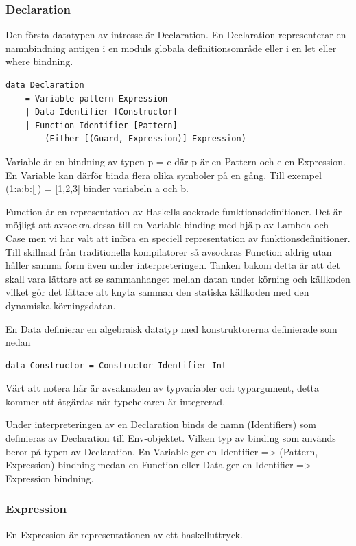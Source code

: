\subsubsection{Declaration}
Den första datatypen av intresse är Declaration. En Declaration representerar en namnbindning antigen i en moduls globala definitionsområde eller i en let eller where bindning.

\begin{lstlisting}
data Declaration 
    = Variable pattern Expression
    | Data Identifier [Constructor]
    | Function Identifier [Pattern] 
        (Either [(Guard, Expression)] Expression)
\end{lstlisting}

Variable är en bindning av typen p = e där p är en Pattern och e en Expression. En Variable kan därför binda flera olika symboler på en gång. Till exempel (1:a:b:[]) = [1,2,3] binder variabeln a och b.

Function är en representation av Haskells sockrade funktionsdefinitioner. Det är möjligt att avsockra dessa till en Variable binding med hjälp av Lambda och Case men vi har valt att införa en speciell representation av funktionsdefinitioner. Till skillnad från traditionella kompilatorer så avsockras Function aldrig utan håller samma form även under interpreteringen. Tanken bakom detta är att det skall vara lättare att se sammanhanget mellan datan under körning och källkoden vilket gör det lättare att knyta samman den statiska källkoden med den dynamiska körningsdatan.

En Data definierar en algebraisk datatyp med konstruktorerna definierade som nedan
\begin{lstlisting}
data Constructor = Constructor Identifier Int
\end{lstlisting}
Värt att notera här är avsaknaden av typvariabler och typargument, detta kommer att åtgärdas när typchekaren är integrerad.

Under interpreteringen av en Declaration binds de namn (Identifiers) som definieras av Declaration till Env-objektet. Vilken typ av binding som används beror på typen av Declaration. En Variable ger en Identifier => (Pattern, Expression) bindning medan en Function eller Data ger en Identifier => Expression bindning.

\subsubsection{Expression}
En Expression är representationen av ett haskelluttryck.

